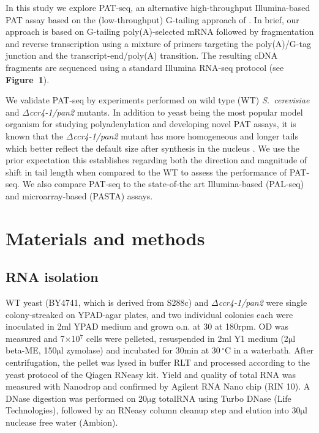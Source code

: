 \documentclass[10pt]{article}
\newcommand{\mul}{\ensuremath{\mathrm{\mu l}}}
\newcommand{\C}{\,$^{\circ}\mathrm{C}$}
\begin{document}
In this study we explore PAT-seq, an alternative high-throughput Illumina-based PAT assay based on the (low-throughput) G-tailing approach of \cite{kusov01}. In brief, our approach is based on G-tailing poly(A)-selected mRNA followed by fragmentation and reverse transcription using a mixture of primers targeting the poly(A)/G-tag junction and the transcript-end/poly(A) transition. The resulting cDNA fragments are sequenced using a standard Illumina RNA-seq protocol (see \textbf{Figure~1}).

We validate PAT-seq by experiments performed on wild type (WT) \textit{S.~cerevisiae} and \textit{$\Delta$ccr4-1/pan2} mutants. In addition to yeast being the most popular model organism for studying polyadenylation and developing novel PAT assays, it is known that the \textit{$\Delta$ccr4-1/pan2} mutant has more homogeneous and longer tails which better reflect the default size after synthesis in the nucleus \cite{beilharz07,traven05}. We use the prior expectation this establishes regarding both the direction and magnitude of shift in tail length when compared to the WT to assess the performance of PAT-seq. We also compare PAT-seq to the state-of-the art Illumina-based (PAL-seq) and microarray-based (PASTA) assays.

\section*{Materials and methods}

\subsection*{RNA isolation}

WT yeast (BY4741, which is derived from S288c) and \textit{$\Delta$ccr4-1/pan2} \cite{beilharz07} were single colony-streaked on YPAD-agar plates, and two individual colonies each were inoculated in 2ml YPAD medium and grown o.n. at 30 at 180rpm. OD was measured and 7$\times$10$^7$ cells were pelleted, resuspended in 2ml Y1 medium (2{\mul} beta-ME, 150{\mul} zymolase) and incubated for 30min at 30{\C} in a waterbath. After centrifugation, the pellet was lysed in buffer RLT and processed according to the yeast protocol of the Qiagen RNeasy kit. Yield and quality of total RNA was measured with Nanodrop and confirmed by Agilent RNA Nano chip (RIN 10). A DNase digestion was performed on 20$\mathrm{\mu g}$ totalRNA using Turbo DNase (Life Technologies), followed by an RNeasy column cleanup step and elution into 30{\mul} nuclease free water (Ambion).
\end{document}
